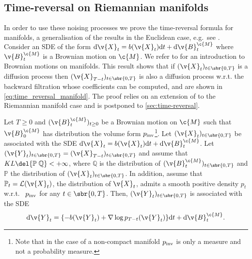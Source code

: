 \subsection{Time-reversal on Riemannian manifolds}
\label{sec:brown-moti-comp}

In order to use these noising processes we prove the time-reversal formula for manifolds, a generalisation of the results in the Euclidean case, e.g.\ see \textcite[Theorem 4.9]{cattiaux2021time}.
Consider an SDE of the form $\mathrm{d} \v{X}_t = b(\v{X}_t) \mathrm{d} t + \mathrm{d} \v{B}_t^\c{M}$ where $\v{B}_t^\c{M}$ is a Brownian motion on $\c{M}$.
We refer to  for an introduction to Brownian motions on manifolds.
This result shows that if $(\v{X}_t)_{t \in \sbr{0,T}}$ is a diffusion process then $(\v{X}_{T-t})_{t \in \sbr{0,T}}$ is also a diffusion process w.r.t.
the backward filtration whose coefficients can be computed, and are shown in \cref{eq:time_reversal_manifold}.
The proof relies on an extension of \textcite[Theorem 4.9]{cattiaux2021time} to the Riemannian manifold case and is postponed to \cref{sec:time-reversal}.

\begin{theorem}
	\label{thm:time_reversal_manifold}
	Let $T \geq 0$ and $(\v{B}_t^\c{M})_{t \geq 0}$ be a Brownian motion on $\c{M}$ such that $\v{B}_0^\c{M}$ has distribution the volume form $p_{\textup{inv}}$\footnote{Note that in the case of a non-compact manifold $p_{\textup{inv}}$ is only a measure and not a probability measure.
	}.
	Let $(\v{X}_t)_{t \in \sbr{0,T}}$ be associated with the SDE $\mathrm{d} \v{X}_t = b(\v{X}_t) \mathrm{d} t + \mathrm{d} \v{B}_t^\c{M}$.
	Let $(\v{Y}_t)_{t \in \sbr{0,T}} = (\v{X}_{T-t})_{t \in \sbr{0,T}}$ and assume that $KL\del{\mathbb{P}\;\mathbb{Q}} < +\infty$, where $\mathbb{Q}$ is the distribution of $(\v{B}_t^\c{M})_{t \in \sbr{0,T}}$ and $\mathbb{P} $ the distribution of $(\v{X}_t)_{t \in \sbr{0,T}}$.
	In addition, assume that $\mathbb{P}_t=\mathcal{L}(\v{X}_t)$, the distribution of $\v{X}_t$, admits a smooth positive density $p_t$ w.r.t.
	\ $p_{\textup{inv}}$ for any $t \in \sbr{0,T}$.
	Then, $(\v{Y}_t)_{t \in \sbr{0,T}}$ is associated with the SDE \begin{equation} \label{eq:time_reversal_manifold} \mathrm{d} \v{Y}_t = \{-b(\v{Y}_t) + \nabla \log p_{T-t}(\v{Y}_t)\} \mathrm{d} t + \mathrm{d} \v{B}_t^\c{M}.
	\end{equation}
\end{theorem}


